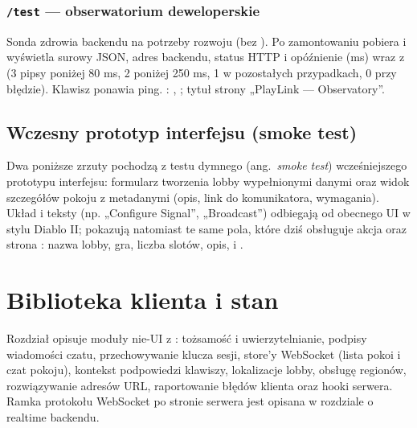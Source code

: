 \subsection{\texttt{/test} --- obserwatorium deweloperskie}

Sonda zdrowia backendu na potrzeby rozwoju (bez ). Po zamontowaniu pobiera
 i wyświetla surowy JSON, adres backendu, status HTTP i opóźnienie
(ms) wraz z  (3 pipsy poniżej 80 ms, 2 poniżej 250 ms, 1 w pozostałych
przypadkach, 0 przy błędzie). Klawisz  ponawia ping. : ,
; tytuł strony „PlayLink --- Observatory”.

\section{Wczesny prototyp interfejsu (smoke test)}\label{sec:fe-smoke}

Dwa poniższe zrzuty pochodzą z testu dymnego (ang.\ \emph{smoke test}) wcześniejszego prototypu
interfejsu: formularz tworzenia lobby wypełnionymi danymi oraz widok szczegółów pokoju z metadanymi
(opis, link do komunikatora, wymagania). Układ i teksty (np. „Configure Signal”, „Broadcast”)
odbiegają od obecnego UI w stylu Diablo II; pokazują natomiast te same pola, które dziś obsługuje
akcja  oraz strona : nazwa lobby, gra, liczba slotów,
opis,  i .



\chapter{Biblioteka klienta i stan}\label{ch:fe-biblioteka}

Rozdział opisuje moduły nie-UI z : tożsamość i uwierzytelnianie, podpisy
wiadomości czatu, przechowywanie klucza sesji, store'y WebSocket (lista pokoi i czat pokoju),
kontekst podpowiedzi klawiszy, lokalizacje lobby, obsługę regionów, rozwiązywanie adresów URL,
raportowanie błędów klienta oraz hooki serwera. Ramka protokołu WebSocket po stronie serwera jest
opisana w rozdziale o realtime backendu.

